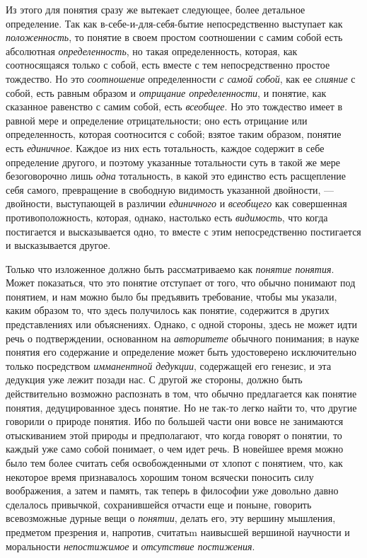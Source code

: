 \documentclass[twoside]{article}
\begin{document}
{{Из этого для понятия сразу же вытекает следующее, более детальное 
определение. Так как в-себе-и-для-себя-бытие непосредственно выступает как 
{\em положенность}, то понятие в своем простом соотношении с самим собой есть 
абсолютная {\em определенность}, но такая определенность, которая, как 
соотносящаяся только с собой, есть вместе с тем непосредственно простое 
тождество. Но это {\em соотношение} определенности {\em с самой собой}, как 
ее {\em слияние} с собой, есть равным образом и {\em отрицание определенности}, 
и понятие, как сказанное равенство с самим собой, есть {\em всеобщее}.
Но это тождество имеет в равной мере и определение отрицательности; оно есть 
отрицание или определенность, которая соотносится с собой; взятое таким 
образом, понятие есть {\em единичное}. Каждое из них есть тотальность, каждое 
содержит в себе определение другого, и поэтому указанные тотальности суть в 
такой же мере безоговорочно лишь {\em одна} тотальность, в какой это 
единство есть расщепление себя самого, превращение в свободную видимость 
указанной двойности, — двойности, выступающей в различии {\em единичного}
и {\em всеобщего} как совершенная противоположность, которая, однако, настолько
есть {\em видимость}, что когда постигается и высказывается одно, то вместе 
с этим непосредственно постигается и высказывается другое.

Только что изложенное должно быть рассматриваемо как {\em понятие понятия}.
Может показаться, что это понятие отступает от того, что обычно понимают под 
понятием, и нам можно было бы предъявить требование, чтобы мы указали, каким 
образом то, что здесь получилось как понятие, содержится в других 
представлениях или объяснениях. Однако, с одной стороны, здесь не может идти 
речь о подтверждении, основанном на {\em авторитете} обычного понимания; в 
науке понятия его содержание и определение может быть удостоверено 
исключительно только посредством {\em имманентной дедукции}, содержащей его 
генезис, и эта дедукция уже лежит позади нас. С другой же стороны, должно 
быть действительно возможно распознать в том, что обычно предлагается как 
понятие понятия, дедуцированное здесь понятие. Но не так-то легко найти то, 
что другие говорили о природе понятия. Ибо по большей части они вовсе не 
занимаются отыскиванием этой природы и предполагают, что когда говорят о 
понятии, то каждый уже само собой понимает, о чем идет речь. В новейшее 
время можно было тем более считать себя освобожденными от хлопот с понятием, 
что, как некоторое время признавалось хорошим тоном всячески поносить силу 
воображения, а затем и память, так теперь в философии уже довольно давно 
сделалось привычкой, сохранившейся отчасти еще и поныне, говорить 
всевозможные дурные вещи о {\em понятии}, делать его, эту вершину мышления, 
предметом презрения и, напротив, считатьm наивысшей вершиной научности и 
моральности {\em непостижимое} и {\em отсутствие постижения}\label{bkm:bm06}.

}}
\end{document}
